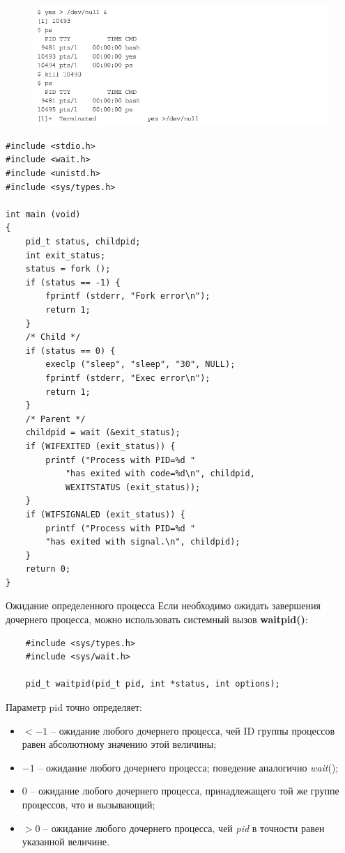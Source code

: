 \documentclass[xcolor=table]{beamer}
\begin{document}
\begin{frame}
	\begin{figure}[h]
		\centering
		\includegraphics[scale=0.6]{images/lec07-pic42.png}
	\end{figure}
\end{frame}

\begin{frame}
	\begin{verbatim}
#include <stdio.h>
#include <wait.h>
#include <unistd.h>
#include <sys/types.h>

int main (void)
{
    pid_t status, childpid;    
    int exit_status;    
    status = fork ();    
    if (status == -1) {
        fprintf (stderr, "Fork error\n");
        return 1;
    }
	/* Child */
    if (status == 0) {
        execlp ("sleep", "sleep", "30", NULL);
        fprintf (stderr, "Exec error\n");
        return 1;
    }
    /* Parent */
    childpid = wait (&exit_status);    
    if (WIFEXITED (exit_status)) {
        printf ("Process with PID=%d "
            "has exited with code=%d\n", childpid,
            WEXITSTATUS (exit_status));
    }
    if (WIFSIGNALED (exit_status)) {
        printf ("Process with PID=%d "
        "has exited with signal.\n", childpid);
    }    
    return 0;
}
	\end{verbatim}
\end{frame}

\begin{frame}[fragile]{Ожидание определенного процесса}
	Если необходимо ожидать завершения дочернего процесса, можно использовать системный вызов \textbf{waitpid()}:
	\begin{verbatim}
	#include <sys/types.h>
	#include <sys/wait.h>
	
	pid_t waitpid(pid_t pid, int *status, int options);
	\end{verbatim}
	Параметр pid точно определяет:
	\begin{itemize}
		\item $< -1$ -- ожидание любого дочернего процесса, чей ID группы процессов равен абсолютному значению этой величины;
		\item $-1$ -- ожидание любого дочернего процесса; поведение аналогично \textit{wait}();
		\item $0$ -- ожидание любого дочернего процесса, принадлежащего той же группе процессов, что и вызывающий;
		\item $>0$ -- ожидание любого дочернего процесса, чей \textit{pid} в точности равен указанной величине.
	\end{itemize}
\end{frame}
\end{document}

